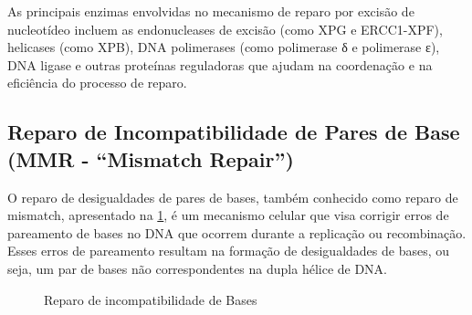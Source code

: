 \documentclass[11pt,a4paper]{article}
\begin{document}
	As principais enzimas envolvidas no mecanismo de reparo por excisão de nucleotídeo incluem as endonucleases de excisão (como XPG e ERCC1-XPF), helicases (como XPB), DNA polimerases (como polimerase δ e polimerase ε), DNA ligase e outras proteínas reguladoras que ajudam na coordenação e na eficiência do processo de reparo.

\subsection*{Reparo de Incompatibilidade de Pares de Base (MMR - ``Mismatch Repair'')}

	O reparo de desigualdades de pares de bases, também conhecido como reparo de mismatch, apresentado na \ref{fig:mismatchReparo}, é um mecanismo celular que visa corrigir erros de pareamento de bases no DNA que ocorrem durante a replicação ou recombinação. Esses erros de pareamento resultam na formação de desigualdades de bases, ou seja, um par de bases não correspondentes na dupla hélice de DNA.

	\begin{figure}[h]
		\centering
		\caption{Reparo de incompatibilidade de Bases}
		\label{fig:mismatchReparo}
	\end{figure}
\end{document}
